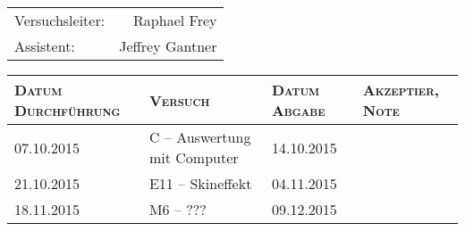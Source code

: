 \begin{titlepage}

    \maketitle

    \vspace{10mm}
    \begin{center}
    \begin{tabular}{lr}

        \Huge{Versuchsleiter:} & \Huge{Raphael Frey} \\
        \Huge{Assistent:} & \Huge{Jeffrey Gantner} \\

    \end{tabular}

    \vspace{20mm}

    \Large
    \begin{tabular}{p{27mm}|p{67mm}|p{23mm}|p{26mm}}


        \textsc{Datum Durchf\"uhrung} & \textsc{Versuch} & \textsc{Datum Abgabe} & \textsc{Akzeptier, Note} \\
        [10mm]
        \hline
        07.10.2015 & C -- Auswertung mit Computer & 14.10.2015 & \\
        [10mm]
        21.10.2015 & E11 -- Skineffekt            & 04.11.2015 & \\
        [10mm]
        18.11.2015 & M6 -- ???                    & 09.12.2015 & \\

    \end{tabular}
    \end{center}
    \normalsize

\end{titlepage}

